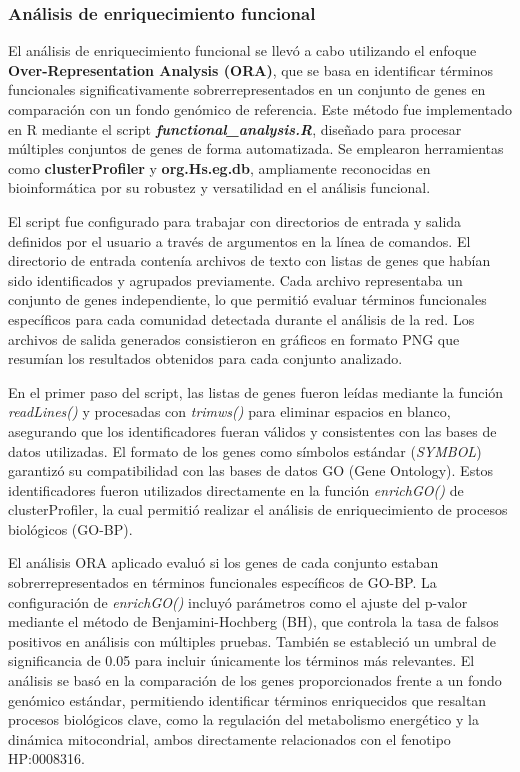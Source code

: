 \subsubsection{Análisis de enriquecimiento funcional}

El análisis de enriquecimiento funcional se llevó a cabo utilizando el enfoque \textbf{Over-Representation Analysis (ORA)}, que se basa en identificar términos funcionales significativamente sobrerrepresentados en un conjunto de genes en comparación con un fondo genómico de referencia. Este método fue implementado en R mediante el script \textbf{\textit{functional\_analysis.R}}, diseñado para procesar múltiples conjuntos de genes de forma automatizada. Se emplearon herramientas como \textbf{clusterProfiler} y \textbf{org.Hs.eg.db}, ampliamente reconocidas en bioinformática por su robustez y versatilidad en el análisis funcional.

El script fue configurado para trabajar con directorios de entrada y salida definidos por el usuario a través de argumentos en la línea de comandos. El directorio de entrada contenía archivos de texto con listas de genes que habían sido identificados y agrupados previamente. Cada archivo representaba un conjunto de genes independiente, lo que permitió evaluar términos funcionales específicos para cada comunidad detectada durante el análisis de la red. Los archivos de salida generados consistieron en gráficos en formato PNG que resumían los resultados obtenidos para cada conjunto analizado.

En el primer paso del script, las listas de genes fueron leídas mediante la función \textit{readLines()} y procesadas con \textit{trimws()} para eliminar espacios en blanco, asegurando que los identificadores fueran válidos y consistentes con las bases de datos utilizadas. El formato de los genes como símbolos estándar (\textit{SYMBOL}) garantizó su compatibilidad con las bases de datos GO (Gene Ontology). Estos identificadores fueron utilizados directamente en la función \textit{enrichGO()} de clusterProfiler, la cual permitió realizar el análisis de enriquecimiento de procesos biológicos (GO-BP).

El análisis ORA aplicado evaluó si los genes de cada conjunto estaban sobrerrepresentados en términos funcionales específicos de GO-BP. La configuración de \textit{enrichGO()} incluyó parámetros como el ajuste del p-valor mediante el método de Benjamini-Hochberg (BH), que controla la tasa de falsos positivos en análisis con múltiples pruebas. También se estableció un umbral de significancia de 0.05 para incluir únicamente los términos más relevantes. El análisis se basó en la comparación de los genes proporcionados frente a un fondo genómico estándar, permitiendo identificar términos enriquecidos que resaltan procesos biológicos clave, como la regulación del metabolismo energético y la dinámica mitocondrial, ambos directamente relacionados con el fenotipo HP:0008316.

